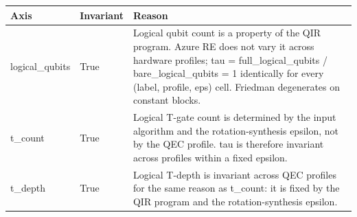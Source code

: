 \begin{tabular}{lll}
\toprule
Axis & Invariant & Reason \\
\midrule
logical\_qubits & True & Logical qubit count is a property of the QIR program. Azure RE does not vary it across hardware profiles; tau = full\_logical\_qubits / bare\_logical\_qubits = 1 identically for every (label, profile, eps) cell. Friedman degenerates on constant blocks. \\
t\_count & True & Logical T-gate count is determined by the input algorithm and the rotation-synthesis epsilon, not by the QEC profile. tau is therefore invariant across profiles within a fixed epsilon. \\
t\_depth & True & Logical T-depth is invariant across QEC profiles for the same reason as t\_count: it is fixed by the QIR program and the rotation-synthesis epsilon. \\
\bottomrule
\end{tabular}
